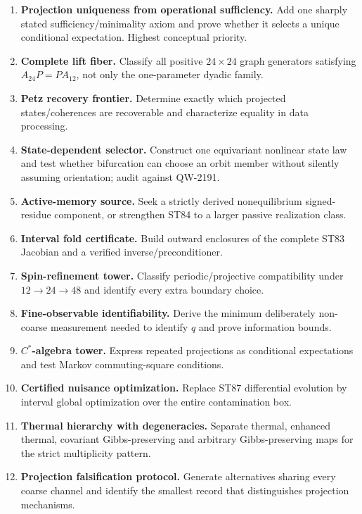 \documentclass[11pt,a4paper]{article}
\begin{document}
\begin{enumerate}
\item[\textbf{ST94}] \textbf{Projection uniqueness from operational sufficiency.} Add one sharply stated sufficiency/minimality axiom and prove whether it selects a unique conditional expectation. Highest conceptual priority.
\item[\textbf{ST95}] \textbf{Complete lift fiber.} Classify all positive $24\times24$ graph generators satisfying $A_{24}P=PA_{12}$, not only the one-parameter dyadic family.
\item[\textbf{ST96}] \textbf{Petz recovery frontier.} Determine exactly which projected states/coherences are recoverable and characterize equality in data processing.
\item[\textbf{ST97}] \textbf{State-dependent selector.} Construct one equivariant nonlinear state law and test whether bifurcation can choose an orbit member without silently assuming orientation; audit against QW-2191.
\item[\textbf{ST98}] \textbf{Active-memory source.} Seek a strictly derived nonequilibrium signed-residue component, or strengthen ST84 to a larger passive realization class.
\item[\textbf{ST99}] \textbf{Interval fold certificate.} Build outward enclosures of the complete ST83 Jacobian and a verified inverse/preconditioner.
\item[\textbf{ST100}] \textbf{Spin-refinement tower.} Classify periodic/projective compatibility under $12\to24\to48$ and identify every extra boundary choice.
\item[\textbf{ST101}] \textbf{Fine-observable identifiability.} Derive the minimum deliberately non-coarse measurement needed to identify $q$ and prove information bounds.
\item[\textbf{ST102}] \textbf{$C^*$-algebra tower.} Express repeated projections as conditional expectations and test Markov commuting-square conditions.
\item[\textbf{ST103}] \textbf{Certified nuisance optimization.} Replace ST87 differential evolution by interval global optimization over the entire contamination box.
\item[\textbf{ST104}] \textbf{Thermal hierarchy with degeneracies.} Separate thermal, enhanced thermal, covariant Gibbs-preserving and arbitrary Gibbs-preserving maps for the strict multiplicity pattern.
\item[\textbf{ST105}] \textbf{Projection falsification protocol.} Generate alternatives sharing every coarse channel and identify the smallest record that distinguishes projection mechanisms.
\end{enumerate}
\end{document}
